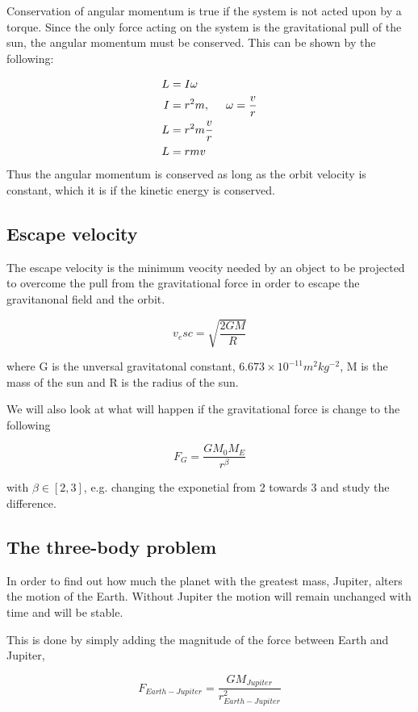 \documentclass[../main.tex]{subfiles}
\begin{document}
Conservation of angular momentum is true if the system is not acted upon by a torque. Since the only force acting on the system is the gravitational pull of the sun, the angular momentum must be conserved. This can be shown by the following:

\begin{align*}
  L &= I \omega \\
  I &= r^2m, \hspace{5mm} \omega = \frac{v}{r} \\
  L &= r^2m \frac{v}{r} \\
  L &= rmv 
\end{align*}
Thus the angular momentum is conserved as long as the orbit velocity is constant, which it is if the kinetic energy is conserved.

\subsection{Escape velocity}
The escape velocity is the minimum veocity needed by an object to be projected to overcome the pull from the gravitational force in order to escape the gravitanonal field and the orbit.

$$v_esc = \sqrt{\frac{2GM}{R}}$$

where G is the unversal gravitatonal constant, $6.673\times 10^{-11} m^2kg^{-2}$, M is the mass of the sun and R is the radius of the sun.

We will also look at what will happen if the gravitational force is change to the following

$$F_G = \frac{GM_0M_E}{r^{\beta}}$$

with $\beta \in [2,3]$, e.g. changing the exponetial from 2 towards 3 and study the difference.

\subsection{The three-body problem}
In order to find out how much the planet with the greatest mass, Jupiter, alters the motion of the Earth. Without Jupiter the motion will remain unchanged with time and  will be stable.

This is done by simply adding the magnitude of the force between Earth and Jupiter,

\begin{equation}
  F_{Earth-Jupiter} = \frac{GM_{Jupiter}}{r^2_{Earth-Jupiter}}
\end{equation}
\end{document}
